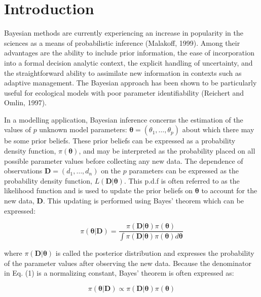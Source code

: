 
\section{Introduction}

Bayesian methods are currently experiencing an increase in popularity in the sciences as a means of probabilistic inference (Malakoff, 1999). Among their advantages are the ability to include prior information, the ease of incorporation into a formal decision analytic context, the explicit handling of uncertainty, and the straightforward ability to assimilate new information in contexts such as adaptive management. The Bayesian approach has been shown to be particularly useful for ecological models with poor parameter identifiability (Reichert and Omlin, 1997).

In a modelling application, Bayesian inference concerns the estimation of the values of $p$ unknown model parameters: $\boldsymbol{\theta} = (\theta_1, \ldots, \theta_p)$ about which there may be some prior beliefs. These prior beliefs can be expressed as a probability density function, $\pi(\boldsymbol{\theta})$, and may be interpreted as the probability placed on all possible parameter values before collecting any new data. The dependence of observations $\mathbf{D} = (d_1, \ldots, d_n)$ on the $p$ parameters can be expressed as the probability density function, $L(\mathbf{D} | \boldsymbol{\theta})$. This p.d.f is often referred to as the likelihood function and is used to update the prior beliefs on $\boldsymbol{\theta}$ to account for the new data, $\mathbf{D}$. This updating is performed using Bayes’ theorem which can be expressed:

\begin{equation}
\pi(\boldsymbol{\theta} | \mathbf{D}) = \frac{\pi(\mathbf{D} | \boldsymbol{\theta})\pi(\boldsymbol{\theta})}{\int \pi(\mathbf{D} | \boldsymbol{\theta})\pi(\boldsymbol{\theta}) d\boldsymbol{\theta}}
\end{equation}

where $\pi(\mathbf{D} | \boldsymbol{\theta})$ is called the posterior distribution and expresses the probability of the parameter values after observing the new data. Because the denominator in Eq. (1) is a normalizing constant, Bayes’ theorem is often expressed as:

\begin{equation}
\pi(\boldsymbol{\theta} | \mathbf{D}) \propto \pi(\mathbf{D} | \boldsymbol{\theta})\pi(\boldsymbol{\theta})
\end{equation}

